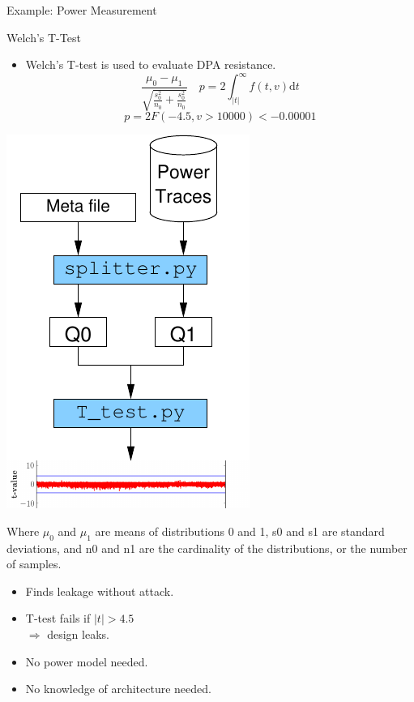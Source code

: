 \documentclass[xcolor=pdftex,dvipsnames,table,final]{beamer}
\begin{document}
\begin{frame}[fragile]{}
\begin{columns}[t]
\begin{column}{.31\linewidth}
\begin{block}{Example: Power Measurement}
      \end{block}
      \begin{block}{Welch's T-Test}
         \vspace{-1ex}
         \begin{itemize}
      \item Welch's T-test is used to evaluate DPA resistance.
      $$\frac{\mu_0 - \mu_1}{\sqrt{\frac{s_0^2}{n_0}+ \frac{s_0^2}{n_0}}} 
         \quad p = 2 \int_{|t|}^\infty f(t,v) \mathrm{d}t $$
      $$ p = 2F(-4.5,v > 10000) < -0.00001$$
         \end{itemize}
         \begin{minipage}{0.4\linewidth}
        \begin{center}
     \includegraphics[scale=1.5]{../figures/t-test-flow}
        \end{center} 
        \end{minipage}
         \begin{minipage}{0.5\linewidth}
      {\small
          Where $\mu_0$ and $\mu_1$ are means of distributions 0 and 1, s0 and s1 are standard deviations, and n0 and n1 are the cardinality of the distributions, or the number of samples.
          }
         \begin{itemize}
           \item Finds leakage without attack.
           \item T-test fails if $|t| > 4.5$\\ $\Rightarrow$ {\color{red}design leaks}.
           \item No power model needed.
           \item No knowledge of architecture needed.
         \end{itemize}
        \end{minipage}
         

\end{block}
\end{column}
\end{columns}
\end{frame}
\end{document}
